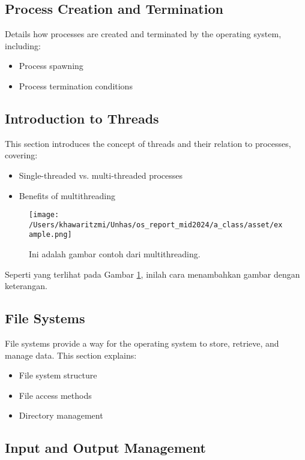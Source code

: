 \documentclass[12pt]{article}
\begin{document}
\subsection{Process Creation and Termination}
Details how processes are created and terminated by the operating system, including:
\begin{itemize}
    \item Process spawning
    \item Process termination conditions
\end{itemize}

\subsection{Introduction to Threads}
This section introduces the concept of threads and their relation to processes, covering:
\begin{itemize}
    \item Single-threaded vs. multi-threaded processes
    \item Benefits of multithreading
\end{itemize}

\begin{figure}[h]
    \centering
    \texttt{[image: /Users/khawaritzmi/Unhas/os\_report\_mid2024/a\_class/asset/example.png]}  %
    \caption{Ini adalah gambar contoh dari multithreading.}
    \label{fig:contoh_gambar}
\end{figure}

Seperti yang terlihat pada Gambar \ref{fig:contoh_gambar}, inilah cara menambahkan gambar dengan keterangan.

\subsection{File Systems}
File systems provide a way for the operating system to store, retrieve, and manage data. This section explains:
\begin{itemize}
    \item File system structure
    \item File access methods
    \item Directory management
\end{itemize}

\subsection{Input and Output Management}
\end{document}
